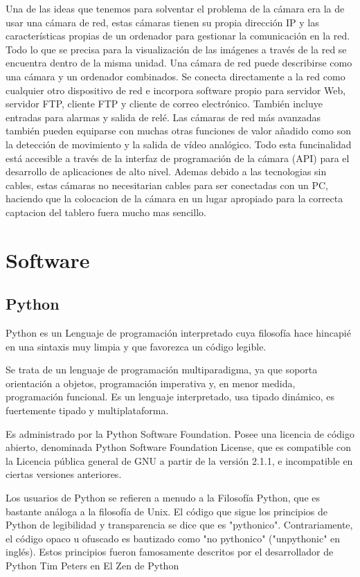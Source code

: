 \documentclass[12pt,a4paper]{report}
\begin{document}
Una de las ideas que tenemos para solventar el problema de la cámara era la de
usar una cámara de red, estas cámaras tienen su propia dirección IP y las
características
propias de un ordenador para gestionar la comunicación en la red.
Todo lo que se precisa para la visualización de las imágenes a través
de la red se encuentra dentro de la misma unidad.
Una cámara de red puede describirse como una cámara y un
ordenador combinados. Se conecta directamente a la red como
cualquier otro dispositivo de red e incorpora software propio para
servidor Web, servidor FTP, cliente FTP y cliente de correo electrónico.
También incluye entradas para alarmas y salida de relé.
Las cámaras de red más avanzadas también pueden equiparse con
muchas otras funciones de valor añadido como son la detección de
movimiento y la salida de vídeo analógico.
Todo esta funcinalidad está accesible a través de la interfaz de
programación de la cámara (API) para el desarrollo de aplicaciones de
alto nivel.
Ademas debido a las tecnologias sin cables, estas cámaras no necesitarian cables
para ser conectadas con un PC, haciendo que la colocacion de la cámara en un
lugar apropiado para la correcta captacion del tablero fuera mucho mas sencillo.

\chapter{Software}
\section{Python}

Python es un Lenguaje de programación interpretado cuya filosofía hace hincapié
en una sintaxis muy limpia y que favorezca un código legible.

Se trata de un lenguaje de programación multiparadigma, ya que soporta
orientación a objetos, programación imperativa y, en menor medida, programación
funcional. Es un lenguaje interpretado, usa tipado dinámico, es fuertemente
tipado y multiplataforma.

Es administrado por la Python Software Foundation. Posee una licencia de código
abierto, denominada Python Software Foundation License, que es compatible con
la Licencia pública general de GNU a partir de la versión 2.1.1, e incompatible
en ciertas versiones anteriores.

Los usuarios de Python se refieren a menudo a la Filosofía Python, que es
bastante análoga a la filosofía de Unix. El código que sigue los principios de
Python de legibilidad y transparencia se dice que es "pythonico".
Contrariamente, el código opaco u ofuscado es bautizado como "no pythonico"
("unpythonic" en inglés). Estos principios fueron famosamente descritos por el
desarrollador de Python Tim Peters en El Zen de Python
\end{document}
